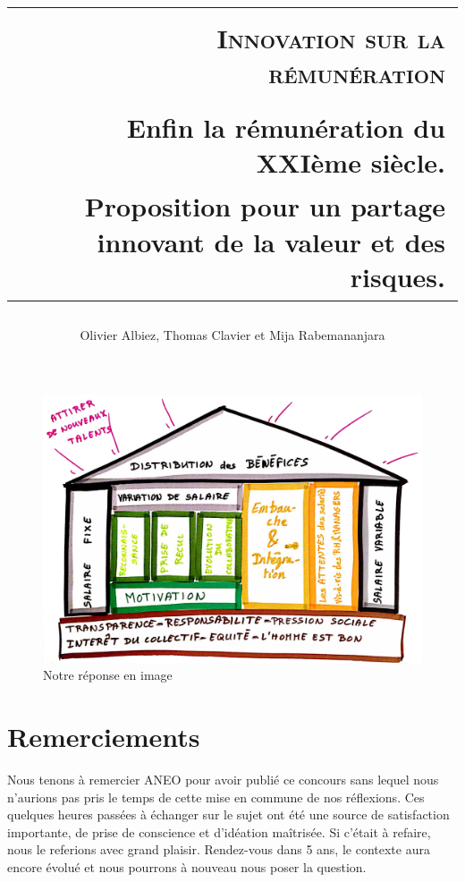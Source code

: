 \documentclass[12pt]{article}
\title{
  \begin{tabular}{p{2 cm} r}
    \hline\hline
    & \\
    & \textsc{Innovation sur la rémunération} \\
    & \\
    & \small{Enfin la rémunération du XXIème siècle.}\\
    & \small{Proposition pour un partage innovant de la valeur et des risques.} \\
    \hline\hline
  \end{tabular}
}
\date{}
\author{Olivier Albiez, Thomas Clavier et Mija Rabemananjara}
\begin{document}
\maketitle
\newpage

\tableofcontents
\newpage

\begin{figure}
  \begin{center}
    \includegraphics[width=\textwidth]{includes/main}
  \end{center}
  \caption{Notre réponse en image}
  \label{main}
\end{figure}



\section{Remerciements}

Nous tenons à remercier ANEO pour avoir publié ce concours sans lequel nous n’aurions pas pris le temps de cette mise en commune de nos réflexions. Ces quelques heures passées à échanger sur le sujet ont été une source de satisfaction importante, de prise de conscience et d’idéation maîtrisée. Si c’était à refaire, nous le referions avec grand plaisir. Rendez-vous dans 5 ans, le contexte aura encore évolué et nous pourrons à nouveau nous poser la question.
\end{document}
